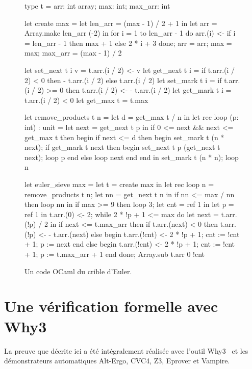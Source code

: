 \documentclass[a4paper]{easychair}
\begin{document}
\begin{figure}[tp]
\begin{ocaml}
type t = { arr: int array; max: int; max_arr: int }

let create max =
  let len_arr = (max - 1) / 2 + 1 in
  let arr = Array.make len_arr (-2) in
  for i = 1 to len_arr - 1 do
    arr.(i) <- if i = len_arr - 1 then max + 1 else 2 * i + 3
  done;
  { arr = arr; max = max; max_arr = (max - 1) / 2 }

let set_next t i v = t.arr.(i / 2) <- v
let get_next t i = if t.arr.(i / 2) < 0 then - t.arr.(i / 2) else t.arr.(i / 2)
let set_mark t i = if t.arr.(i / 2) >= 0 then t.arr.(i / 2) <- - t.arr.(i / 2)
let get_mark t i = t.arr.(i / 2) < 0
let get_max t = t.max

let remove_products t n =
  let d = get_max t / n in
  let rec loop (p: int) : unit =
    let next = get_next t p in
    if 0 <= next && next <= get_max t then begin
      if next <= d then begin
        set_mark t (n * next);
        if get_mark t next then begin set_next t p (get_next t next); loop p end
        else loop next
      end end in
  set_mark t (n * n); loop n

let euler_sieve max =
  let t = create max in
  let rec loop n =
    remove_products t n;
    let nn = get_next t n in
    if nn <= max / nn then loop nn in
  if max >= 9 then loop 3;
  let cnt = ref 1 in
  let p = ref 1 in t.arr.(0) <- 2;
  while 2 * !p + 1 <= max do
    let next = t.arr.(!p) / 2 in
    if next <= t.max_arr then
      if t.arr.(next) < 0 then t.arr.(!p) <- - t.arr.(next)
      else begin t.arr.(!cnt) <- 2 * !p + 1; cnt := !cnt + 1; p := next end
    else begin t.arr.(!cnt) <- 2 * !p + 1; cnt := !cnt + 1; p := t.max_arr + 1 end
  done;
  Array.sub t.arr 0 !cnt
\end{ocaml}
\caption{Un code OCaml du crible d'Euler.}
\label{fig:codeOCaml}
\end{figure}

\section{Une vérification formelle avec Why3}
\label{sec:preuve}


La preuve que décrite ici a été intégralement réalisée avec l'outil
Why3~\cite{why3} et les démonstrateurs automatiques Alt-Ergo, CVC4, Z3, Eprover
et Vampire. %
\end{document}
